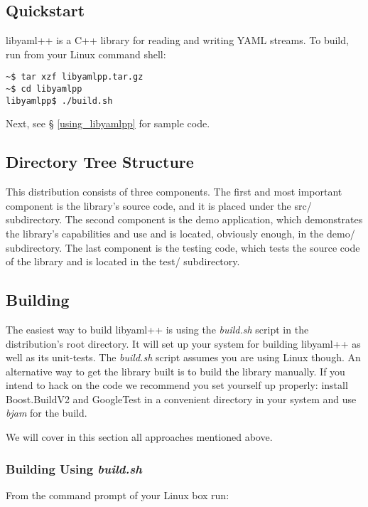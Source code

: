 \documentclass{article}
\begin{document}
\subsection{Quickstart}

libyaml++ is a C++ library for reading and writing YAML streams.  To build,
run from your Linux command shell:

\begin{verbatim}
~$ tar xzf libyamlpp.tar.gz
~$ cd libyamlpp
libyamlpp$ ./build.sh
\end{verbatim}

Next, see \S{} \ref{using_libyamlpp} for sample code.

\subsection{Directory Tree Structure}

This distribution consists of three components.  The first and most important
component is the library's source code, and it is placed under the src/
subdirectory.  The second component is the demo application, which demonstrates
the library's capabilities and use and is located, obviously enough, in the
demo/ subdirectory.  The last component is the testing code, which tests the
source code of the library and is located in the test/ subdirectory.

\subsection{Building}

The easiest way to build libyaml++ is using the \textit{build.sh} script in the
distribution's root directory.  It will set up your system for building
libyaml++ as well as its unit-tests.  The \textit{build.sh} script assumes you
are using Linux though.  An alternative way to get the library built is to
build the library manually.  If you intend to hack on the code we recommend
you set yourself up properly: install Boost.BuildV2 and GoogleTest in a
convenient directory in your system and use \emph{bjam} for the build.

We will cover in this section all approaches mentioned above.

\subsubsection{Building Using \textit{build.sh}}

From the command prompt of your Linux box run:
\end{document}
